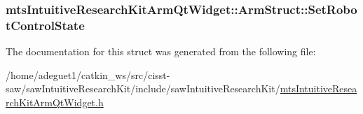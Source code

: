 \hypertarget{structmts_intuitive_research_kit_arm_qt_widget_1_1_arm_struct_a91a2147d07e6b4e2c578bac2a0250696}{
\subsubsection[{Set\-Robot\-Control\-State}]{ mts\-Intuitive\-Research\-Kit\-Arm\-Qt\-Widget\-::\-Arm\-Struct\-::\-Set\-Robot\-Control\-State}}\label{structmts_intuitive_research_kit_arm_qt_widget_1_1_arm_struct_a91a2147d07e6b4e2c578bac2a0250696}


The documentation for this struct was generated from the following file\-:\begin{DoxyCompactItemize}
\item 
/home/adeguet1/catkin\-\_\-ws/src/cisst-\/saw/saw\-Intuitive\-Research\-Kit/include/saw\-Intuitive\-Research\-Kit/\hyperlink{mts_intuitive_research_kit_arm_qt_widget_8h}{mts\-Intuitive\-Research\-Kit\-Arm\-Qt\-Widget.\-h}\end{DoxyCompactItemize}
